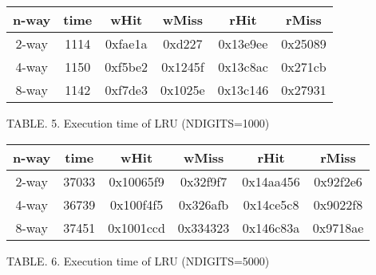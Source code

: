 \documentclass{article}
\begin{document}
\begin{CJK*}{UTF8}{bsmi}
\begin{multicols}{2}
\begin{center}
    \begin{tabular}{||c c c c c c ||} 
        \hline
        n-way & time & wHit & wMiss & rHit & rMiss \\ [1.0ex] 
        \hline\hline
        2-way & 1114 & 0xfae1a & 0xd227 & 0x13e9ee & 0x25089  \\ 
        \hline
        4-way & 1150 & 0xf5be2 & 0x1245f & 0x13c8ac & 0x271cb  \\ 
        \hline
        8-way & 1142 & 0xf7de3 & 0x1025e & 0x13c146 & 0x27931 \\
        \hline
    \end{tabular}
\end{center}

\begin{center}
    \footnotesize TABLE. 5. Execution time of LRU (NDIGITS=1000)
\end{center}

\begin{center}
    \begin{tabular}{||c c c c c c ||} 
        \hline
        n-way & time & wHit & wMiss & rHit & rMiss \\ [1.0ex] 
        \hline\hline
        2-way & 37033 & 0x10065f9 & 0x32f9f7 & 0x14aa456 & 0x92f2e6  \\ 
        \hline
        4-way & 36739 & 0x100f4f5 & 0x326afb & 0x14ce5c8 & 0x9022f8  \\ 
        \hline
        8-way & 37451 & 0x1001ccd & 0x334323 & 0x146c83a & 0x9718ae \\
        \hline
    \end{tabular}
\end{center}

\begin{center}
    \footnotesize TABLE. 6. Execution time of LRU (NDIGITS=5000)
\end{center}


\end{multicols}
\end{CJK*}
\end{document}
